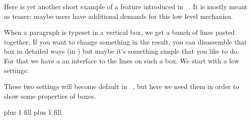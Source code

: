 %

\bitwiseflip \normalizelinemode \plusthree


\usemodule[scite]

\startbuffer[abstract]
    Here is yet another short example of a feature introduced in \CONTEXT\ \LMTX.
    It is mostly meant as teaser: maybe users have additional demands for this
    low level mechanisn.
\stopbuffer

\setuplayout
  [backspace=20mm,
   topspace=10mm]

\startdocument
  [title={Playing with boxes, a teaser},
   author={Hans Hagen},
   date=August 2020,
   number=1105 LMTX]

When a paragraph is typeset in a vertical box, we get a bunch of lines pasted
together. If you want to change something in the result, you can disassemble that
box in detailed ways (in \LUA) but maybe it's something simple that you like to
do. For that we have a an interface to the lines on such a box. We start with a
few settings:

\starttyping[option=TEX]
\bitwiseflip \normalizelinemode \plusthree %
\stoptyping

These two settings will become default in \CONTEXT\ \LMTX, but here we need them in
order to show some properties of boxes.

\startbuffer[sample]
 \bgroup
    \leftskip         10pt
    \rightskip        20pt
    \hangindent       40pt
    \parindent         5pt
    \parfillleftskip  80pt plus 1 fill
    \parfillrightskip 40pt plus 1 fill
    
\egroup
\stopbuffer

